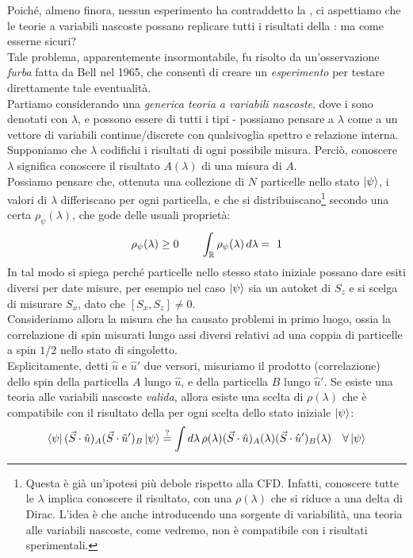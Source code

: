 \documentclass[../../FisicaTeorica.tex]{subfiles}
\begin{document}
Poiché, almeno finora, nessun esperimento ha contraddetto la \MQ, ci aspettiamo che le teorie a variabili nascoste possano replicare tutti i risultati della \MQ: ma come esserne sicuri?\\
Tale problema, apparentemente insormontabile, fu risolto da un'osservazione \textit{furba} fatta da Bell nel 1965, che consentì di creare un \textit{esperimento} per testare direttamente tale eventualità.\\

Partiamo considerando una \textit{generica teoria a variabili nascoste}, dove i  sono denotati con $\lambda$, e possono essere di tutti i tipi - possiamo pensare a $\lambda$ come a un vettore di variabili continue/discrete con qualsivoglia spettro e relazione interna. Supponiamo che $\lambda$ codifichi i risultati di ogni possibile misura. Perciò, conoscere $\lambda$ significa conoscere il risultato $A(\lambda)$ di una misura di $A$.\\
Possiamo pensare che, ottenuta una collezione di $N$ particelle nello stato $\Ket{\psi}$, i valori di $\lambda$ differiscano per ogni particella, e che si distribuiscano\footnote{Questa è già un'ipotesi più debole rispetto alla CFD. Infatti, conoscere tutte le $\lambda$ implica conoscere il risultato, con una $\rho(\lambda)$ che si riduce a una delta di Dirac. L'idea è che anche introducendo una sorgente di variabilità, una teoria alle variabili nascoste, come vedremo, non è compatibile con i risultati sperimentali.} secondo una certa $\rho_\psi(\lambda)$, che gode delle usuali proprietà:
\begin{align}
\rho_\psi(\lambda) \geq 0 \qquad \int_{\mathbb{R}} \rho_\psi(\lambda)\,d\lambda =\ 1
\label{eqn:distr_prob}
\end{align}
In tal modo si spiega perché particelle nello stesso stato iniziale possano dare esiti diversi per date misure, per esempio nel caso $\Ket{\psi}$ sia un autoket di $S_z$ e si scelga di misurare $S_x$, dato che $[S_x, S_z]\neq 0$.\\

Consideriamo allora la misura che ha causato problemi in primo luogo, ossia la correlazione di spin misurati lungo assi diversi relativi ad una coppia di particelle a spin $1/2$ nello stato di singoletto.\\
Esplicitamente, detti $\hat{u}$ e $\hat{u}'$ due versori, misuriamo il prodotto (correlazione) dello spin della particella $A$ lungo $\hat{u}$, e della particella $B$ lungo $\hat{u}'$. Se esiste una teoria alle variabili nascoste \textit{valida}, allora esiste una scelta di $\rho(\lambda)$ che è compatibile con il risultato della \MQ per ogni scelta dello stato iniziale $\Ket{\psi}$:
\begin{align*}
\Bra{\psi}(\vec{S}\cdot \hat{u})_A (\vec{S}\cdot \hat{u}')_B \Ket{\psi} \overset{?}{=} \int d\lambda\, \rho(\lambda) (\vec{S}\cdot \hat{u})_A(\lambda)(\vec{S}\cdot \hat{u}')_B(\lambda) \quad \forall \Ket{\psi}
\end{align*}
\end{document}
